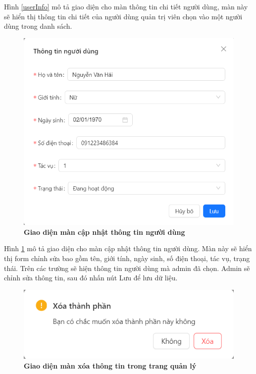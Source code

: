 Hình \ref{userInfo} mô tả giao diện cho màn thông tin chi tiết người dùng, màn này sẽ hiển thị thông tin
chi tiết của người dùng quản trị viên chọn vào một người dùng trong danh sách.

\begin{figure}[H]
  \centering
  \includegraphics[scale=0.7]{Images/server/webUI/updateUser.png}
  \caption[Giao diện màn cập nhật thông tin người dùng]{\bfseries \fontsize{12pt}{0pt}\selectfont Giao diện màn cập nhật thông tin người dùng}
  \label{editUser} %
\end{figure}

Hình \ref{editUser} mô tả giao diện cho màn cập nhật thông tin người dùng. Màn này sẽ hiển thị form chỉnh sửa bao gồm 
tên, giới tính, ngày sinh, số điện thoại, tác vụ, trạng thái. Trên các trường sẽ hiện thông tin người dùng mà admin đã chọn. 
Admin sẽ chỉnh sửa thông tin, sau đó nhấn nút Lưu để lưu dữ liệu.

\begin{figure}[H]
  \centering
  \includegraphics[scale=0.7]{Images/server/webUI/delete.png}
  \caption[Giao diện màn xóa thông tin trong trang quản lý]{\bfseries \fontsize{12pt}{0pt}\selectfont Giao diện màn xóa thông tin trong trang quản lý}
  \label{delete} %
\end{figure}

